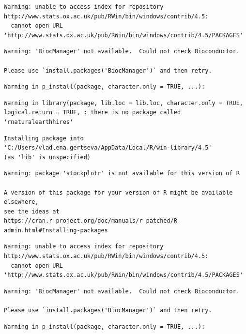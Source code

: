 \documentclass[
]{scrartcl}
\begin{document}
\begin{verbatim}
Warning: unable to access index for repository http://www.stats.ox.ac.uk/pub/RWin/bin/windows/contrib/4.5:
  cannot open URL 'http://www.stats.ox.ac.uk/pub/RWin/bin/windows/contrib/4.5/PACKAGES'
\end{verbatim}

\begin{verbatim}
Warning: 'BiocManager' not available.  Could not check Bioconductor.

Please use `install.packages('BiocManager')` and then retry.
\end{verbatim}

\begin{verbatim}
Warning in p_install(package, character.only = TRUE, ...):
\end{verbatim}

\begin{verbatim}
Warning in library(package, lib.loc = lib.loc, character.only = TRUE,
logical.return = TRUE, : there is no package called 'rnaturalearthhires'
\end{verbatim}

\begin{verbatim}
Installing package into 'C:/Users/vladlena.gertseva/AppData/Local/R/win-library/4.5'
(as 'lib' is unspecified)
\end{verbatim}

\begin{verbatim}
Warning: package 'stockplotr' is not available for this version of R

A version of this package for your version of R might be available elsewhere,
see the ideas at
https://cran.r-project.org/doc/manuals/r-patched/R-admin.html#Installing-packages
\end{verbatim}

\begin{verbatim}
Warning: unable to access index for repository http://www.stats.ox.ac.uk/pub/RWin/bin/windows/contrib/4.5:
  cannot open URL 'http://www.stats.ox.ac.uk/pub/RWin/bin/windows/contrib/4.5/PACKAGES'
\end{verbatim}

\begin{verbatim}
Warning: 'BiocManager' not available.  Could not check Bioconductor.

Please use `install.packages('BiocManager')` and then retry.
\end{verbatim}

\begin{verbatim}
Warning in p_install(package, character.only = TRUE, ...):
\end{verbatim}
\end{document}
